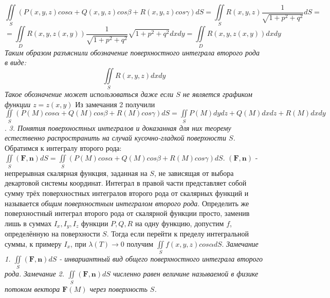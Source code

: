 \documentclass[12pt,a4paper]{article}
\begin{document}
	\[ \iint\limits_{S} (P(x,y,z)cos\alpha + Q(x,y,z)cos\beta + R(x,y,z)cos\gamma) dS = \iint\limits_{S} R(x,y,z) \frac{1}{\sqrt{1 + p^{2} + q^{2}}}dS =\]
	\[ = \iint\limits_{D} R(x,y,z(x,y)) \frac{1}{\sqrt{1 + p^{2} + q^{2}}} \sqrt{1 + p^{2} + q^{2}}dxdy = \iint\limits_{D} R(x,y,z(x,y)) dxdy\]
	\textit{Таким образом разъяснили обозначение поверхностного интеграла второго рода в виде:}
	\[ \iint\limits_{S} R(x,y,z) dxdy\]
	\textit{Такое обозначение может использоваться даже если $S$ не является графиком функции $z = z(x,y)$}
	\newline 
	Из замечания 2 получили $\iint\limits_{S} (P(M)cos\alpha + Q(M)cos\beta + R(M)cos\gamma) dS = \iint\limits_{S} P(M)dydz + Q(M)dxdz + R(M)dxdy$.
	\newline
	\textit{3. Понятия поверхностных интегралов и доказанная для них теорему естественно распространить на случай кусочно-гладкой поверхности $S$.}
	\newline
	\newline
	Обратимся к интегралу второго рода: $\iint\limits_{S} (\textbf{F}, \textbf{n}) dS = \iint\limits_{S} (P(M)cos\alpha + Q(M)cos\beta + R(M)cos\gamma) dS$.  $(\textbf{F}, \textbf{n})$ - непрерывная скалярная функция, заданная на $S$, не зависящая от выбора декартовой системы координат. Интеграл в правой части представляет собой сумму трёх поверхностных интегралов второго рода от скалярных функций и называется \textit{общим поверхностным интегралом второго рода}. Определить же поверхностный интеграл второго рода от скалярной функции просто, заменив лишь в суммах $I_{x}, I_{y}, I_{z}$ функции $P, Q, R$ на одну функцию, допустим $f$, определённую на поверхности $S$. Тогда если перейти к пределу интегральной суммы, к примеру $I_{x}$, при $\lambda(T) \rightarrow 0$ получим $\iint\limits_{S}f(x,y,z)cos\alpha dS$.
	\newline
	\textit{Замечание 1. $\iint\limits_{S} (\textbf{F}, \textbf{n}) dS$ - инвариантный вид общего поверхностного интеграла второго рода.}
	\newline
	\textit{Замечание 2. $\iint\limits_{S} (\textbf{F}, \textbf{n}) dS$ численно равен величине называемой в физике потоком вектора $\textbf{F}(M)$ через поверхность $S$.}

	\newpage
\end{document}
